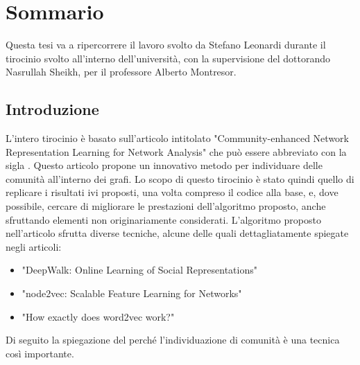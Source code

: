 %
%
%
\chapter{Sommario}
Questa tesi va a ripercorrere il lavoro svolto da Stefano Leonardi durante il tirocinio svolto all'interno dell'università, con la supervisione del dottorando Nasrullah Sheikh, per il professore Alberto Montresor.
%
\section{Introduzione}
L'intero tirocinio è basato sull'articolo intitolato "Community-enhanced Network Representation Learning for Network Analysis"\cite{CNRL_paper} che può essere abbreviato con la sigla \cnrl. Questo articolo propone un innovativo metodo per individuare delle comunità all'interno dei grafi. Lo scopo di questo tirocinio è stato quindi quello di replicare i risultati ivi proposti, una volta compreso il codice alla base, e, dove possibile, cercare di migliorare le prestazioni dell'algoritmo proposto, anche sfruttando elementi non originariamente considerati.\newline
L'algoritmo proposto nell'articolo sfrutta diverse tecniche, alcune delle quali dettagliatamente spiegate negli articoli:
\begin{itemize}
	\item "DeepWalk: Online Learning of Social Representations"\cite{DW_paper}
	\item "node2vec: Scalable Feature Learning for Networks"\cite{N2V_paper}
	\item "How exactly does word2vec work?"\cite{W2V_paper}
\end{itemize} 
Di seguito la spiegazione del perché l'individuazione di comunità è una tecnica così importante.
%

